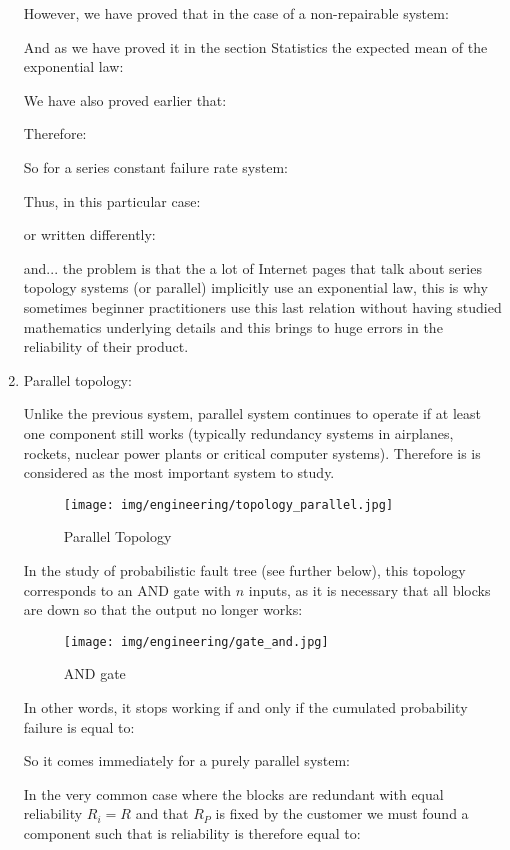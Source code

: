 \begin{enumerate}
		However, we have proved that in the case of a non-repairable system:
		
		And as we have proved it in the section Statistics the expected mean of the exponential law:
		
		We have also proved earlier that:
		
		Therefore:
		
		So for a series constant failure rate system:
		
		Thus, in this particular case:
		
		or written differently:
		
		and... the problem is that the a lot of Internet pages that talk about series topology systems (or parallel) implicitly use an exponential law, this is why sometimes beginner practitioners use this last relation without having studied mathematics underlying details and this brings to huge errors in the reliability of their product.
		\item Parallel topology:
		
		Unlike the previous system, parallel system continues to operate if at least one component still works (typically redundancy systems in airplanes, rockets, nuclear power plants or critical computer systems). Therefore is is considered as the most important system to study.
		\begin{figure}[H]
			\begin{center}
				\texttt{[image: img/engineering/topology\_parallel.jpg]}
			\end{center}	
			\caption{Parallel Topology}
		\end{figure}
		In the study of probabilistic fault tree (see further below), this topology corresponds to an AND gate with $n$ inputs, as it is necessary that all blocks are down so that the output no longer works:
		\begin{figure}[H]
			\begin{center}
				\texttt{[image: img/engineering/gate\_and.jpg]}
			\end{center}	
			\caption{AND gate}
		\end{figure}
		In other words, it stops working if and only if the cumulated probability failure is equal to:		
		
		So it comes immediately for a purely parallel system:
		
		In the very common case where the blocks are redundant with equal reliability $R_i=R$ and that $R_P$ is fixed by the customer we must found a component such that is reliability is therefore equal to:
		

\end{enumerate}
